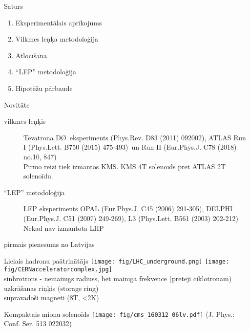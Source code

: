 \documentclass{beamer}
\begin{document}
\begin{frame}{Saturs}
  \begin{enumerate}
  \item Eksperimentālais aprīkojums
  \item Vilkmes leņķa metodoloģija
  \item Atlocīšana
  \item ``LEP'' metodoloģija
  \item Hipotēžu pārbaude
  \end{enumerate}
\end{frame}

\begin{frame}{Novitāte}
  \begin{description}
  \item[vilkmes leņķis]
    Tevatrona D\O\ eksperiments \scriptsize(Phys.Rev. D83 (2011) 092002)\normalsize, ATLAS Run I \scriptsize(Phys.Lett. B750 (2015) 475-493)\normalsize\ un Run II \scriptsize(Eur.Phys.J. C78 (2018) no.10, 847)\normalsize\\
    Pirmo reizi tiek izmantos KMS. KMS 4T solenoīds pret ATLAS 2T solenoīdu.
  \item[``LEP'' metodoloģija]
    LEP eksperiments OPAL \scriptsize(Eur.Phys.J. C45 (2006) 291-305)\normalsize, DELPHI \scriptsize(Eur.Phys.J. C51 (2007) 249-269)\normalsize, L3 \scriptsize(Phys.Lett. B561 (2003) 202-212)\normalsize\\
    Nekad nav izmantota LHP
  \item[pirmais pienesums no Latvijas]
  \end{description}
  
\end{frame}


\begin{frame}{Lielais hadronu paātrinātājs}
  \centering
  \texttt{[image: fig/LHC\_underground.png]}%
  \texttt{[image: fig/CERNacceleratorcomplex.jpg]}\\
  sinhrotrons - nemainīgs radiuss, bet mainīga frekvence (pretēji ciklotronam)\\
  uzkrāšanas riņķis (storage ring)\\
  supravadoši magnēti (8T, <2K)
\end{frame}


\begin{frame}{Kompaktais mionu solenoīds}
  \centering
  \texttt{[image: fig/cms\_160312\_06lv.pdf]}
  (J. Phys.: Conf. Ser. 513 022032)
\end{frame}
\end{document}
